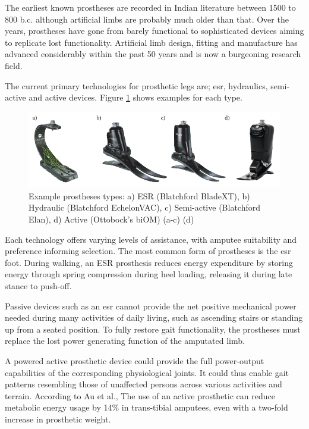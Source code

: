 The earliest known prostheses are recorded in Indian literature between 1500 to 800 b.c. although artificial limbs are probably much older than that\cite{Breakey1976}. Over the years, prostheses have gone from barely functional to sophisticated devices aiming to replicate lost functionality. Artificial limb design, fitting and manufacture has advanced considerably within the past 50 years and is now a burgeoning research field.\cite{Kirkup2007}

The current primary technologies for prosthetic legs are; \acrfull{esr}, hydraulics, semi-active and active devices\cite{Asif2021}. Figure \ref{Fig:CH2-prostheses_type} shows examples for each type.

\begin{figure}[!hbt]
\centering
  \includegraphics[width=\textwidth]{content/2-Background/ch2_prosthetic_device_types.pdf}
  \caption[Example prostheses types]{Example prostheses types: a) ESR (Blatchford BladeXT), b) Hydraulic (Blatchford EchelonVAC), c) Semi-active (Blatchford Elan), d) Active (Ottobock's biOM) (a-c)\cite{blatchford2018} (d)\cite{biom2018} }
  \label{Fig:CH2-prostheses_type}
\end{figure}

Each technology offers varying levels of assistance, with amputee suitability and preference informing selection. The most common form of prostheses is the \acrshort{esr} foot. During walking, an ESR prosthesis reduces energy expenditure by storing energy through spring compression during heel loading, releasing it during late stance to push-off.\cite{Asif2021}

Passive devices such as an \acrshort{esr} cannot provide the net positive mechanical power needed during many activities of daily living, such as ascending stairs or standing up from a seated position\cite{Simon2013}. To fully restore gait functionality, the prostheses must replace the lost power generating function of the amputated limb.

A powered active prosthetic device could provide the full power-output capabilities of the corresponding physiological joints. It could thus enable gait patterns resembling those of unaffected persons across various activities and terrain\cite{Tucker2015, Bhakta2020}. According to Au et al., The use of an active prosthetic can reduce metabolic energy usage by 14\% in trans-tibial amputees, even with a two-fold increase in prosthetic weight\cite{Au2009}.

